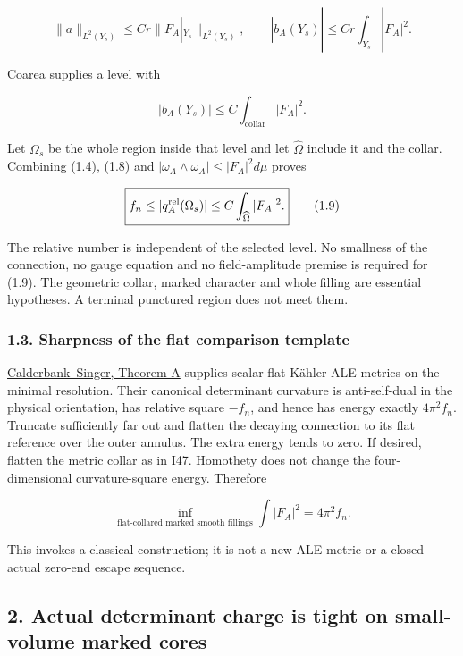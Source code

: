 \documentclass[
  10pt,
]{article}
\begin{document}
\[
 \|a\|_{L^2(Y_s)}\le Cr\|F_A|_{Y_s}\|_{L^2(Y_s)},\qquad
 |b_A(Y_s)|\le Cr\int_{Y_s}|F_A|^2.
 \tag{1.7}
\]

Coarea supplies a level with

\[
 |b_A(Y_s)|\le C\int_{\text{collar}}|F_A|^2.
 \tag{1.8}
\]

Let \(\Omega_s\) be the whole region inside that level and let
\(\widehat\Omega\) include it and the collar. Combining (1.4), (1.8) and
\(|\omega_A\wedge\omega_A|\le|F_A|^2d\mu\) proves

\[
 \boxed{f_n\le |q_A^{\rm rel}(\Omega_s)|
               \le C\int_{\widehat\Omega}|F_A|^2.}
 \tag{1.9}
\]

The relative number is independent of the selected level. No smallness
of the connection, no gauge equation and no field-amplitude premise is
required for (1.9). The geometric collar, marked character and whole
filling are essential hypotheses. A terminal punctured region does not
meet them.

\hypertarget{sharpness-of-the-flat-comparison-template}{%
\subsubsection{1.3. Sharpness of the flat comparison
template}\label{sharpness-of-the-flat-comparison-template}}

\href{https://arxiv.org/html/math/0206229}{Calderbank--Singer, Theorem
A} supplies scalar-flat Kähler ALE metrics on the minimal resolution.
Their canonical determinant curvature is anti-self-dual in the physical
orientation, has relative square \(-f_n\), and hence has energy exactly
\(4\pi^2f_n\). Truncate sufficiently far out and flatten the decaying
connection to its flat reference over the outer annulus. The extra
energy tends to zero. If desired, flatten the metric collar as in I47.
Homothety does not change the four-dimensional curvature-square energy.
Therefore

\[
 \inf_{\text{flat-collared marked smooth fillings}}
                   \int|F_A|^2=4\pi^2 f_n.
 \tag{1.10}
\]

This invokes a classical construction; it is not a new ALE metric or a
closed actual zero-end escape sequence.

\hypertarget{actual-determinant-charge-is-tight-on-small-volume-marked-cores}{%
\subsection{2. Actual determinant charge is tight on small-volume marked
cores}\label{actual-determinant-charge-is-tight-on-small-volume-marked-cores}}
\end{document}
